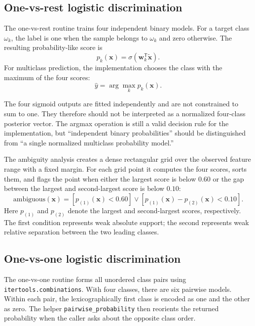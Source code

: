 \documentclass[11pt,a4paper]{article}
\newcommand{\code}[1]{\texttt{#1}}
\begin{document}
\subsection{One-vs-rest logistic discrimination}
The one-vs-rest routine trains four independent binary models. For a target class \(\omega_k\), the label is one when the sample belongs to \(\omega_k\) and zero otherwise. The resulting probability-like score is
\begin{equation}
p_k(\mathbf{x})=\sigma(\mathbf{w}_k^{\mathsf T}\tilde{\mathbf{x}}).
\end{equation}
For multiclass prediction, the implementation chooses the class with the maximum of the four scores:
\begin{equation}
\hat{y}=\arg\max_k p_k(\mathbf{x}).
\end{equation}

The four sigmoid outputs are fitted independently and are not constrained to sum to one. They therefore should not be interpreted as a normalized four-class posterior vector. The argmax operation is still a valid decision rule for the implementation, but ``independent binary probabilities'' should be distinguished from ``a single normalized multiclass probability model.''

The ambiguity analysis creates a dense rectangular grid over the observed feature range with a fixed margin. For each grid point it computes the four scores, sorts them, and flags the point when either the largest score is below \(0.60\) or the gap between the largest and second-largest score is below \(0.10\):
\begin{equation}
\text{ambiguous}(\mathbf{x})
=\left[p_{(1)}(\mathbf{x})<0.60\right]
\lor
\left[p_{(1)}(\mathbf{x})-p_{(2)}(\mathbf{x})<0.10\right].
\end{equation}
Here \(p_{(1)}\) and \(p_{(2)}\) denote the largest and second-largest scores, respectively. The first condition represents weak absolute support; the second represents weak relative separation between the two leading classes.

\subsection{One-vs-one logistic discrimination}
The one-vs-one routine forms all unordered class pairs using \code{itertools.combinations}. With four classes, there are six pairwise models. Within each pair, the lexicographically first class is encoded as one and the other as zero. The helper \code{pairwise\_probability} then reorients the returned probability when the caller asks about the opposite class order.
\end{document}
